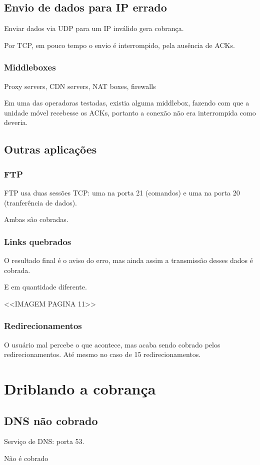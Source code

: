 \documentclass[brazil]{beamer}
\begin{document}
\subsection{Envio de dados para IP errado}

\begin{frame}[fragile]
    Enviar dados via UDP para um IP inválido gera cobrança.

    \vspace{0.4cm}
    Por TCP, em pouco tempo o envio é interrompido, pela ausência de ACKs.
\end{frame}

\begin{frame}[fragile]
    \frametitle{Middleboxes}
    Proxy servers, CDN servers, NAT boxes, firewalls

    \vspace{0.4cm}
    \pause
    Em uma das operadoras testadas, existia alguma middlebox, fazendo com que a unidade móvel recebesse os ACKs, portanto a conexão não era interrompida como deveria.
\end{frame}

\subsection{Outras aplicações}

\begin{frame}[fragile]
    \frametitle{FTP}
    FTP usa duas sessões TCP: uma na porta 21 (comandos) e uma na porta 20 (tranferência de dados).

    \vspace{0.5cm}
    Ambas são cobradas.
\end{frame}

\begin{frame}[fragile]
    \frametitle{Links quebrados}
    O resultado final é o aviso do erro, mas ainda assim a transmissão desses dados é cobrada.

    E em quantidade diferente.

    <<IMAGEM PAGINA 11>>
\end{frame}

\begin{frame}[fragile]
    \frametitle{Redirecionamentos}
    O usuário mal percebe o que acontece, mas acaba sendo cobrado pelos redirecionamentos. Até mesmo no caso de 15 redirecionamentos.
\end{frame}

\section{Driblando a cobrança}

\subsection{DNS não cobrado}
\begin{frame}[fragile]
    Serviço de DNS: porta 53.

    \vspace{0.4cm}
    \Huge{Não é cobrado}
\end{frame}
\end{document}
